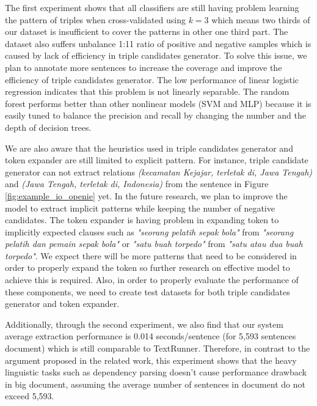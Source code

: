 The first experiment shows that all classifiers are still having problem learning the pattern of triples when cross-validated using $k=3$ which means two thirds of our dataset is insufficient to cover the patterns in other one third part. The dataset also suffers unbalance 1:11 ratio of positive and negative samples which is caused by lack of efficiency in triple candidates generator. To solve this issue, we plan to annotate more sentences to increase the coverage and improve the efficiency of triple candidates generator. The low performance of linear logistic regression indicates that this problem is not linearly separable. The random forest performs better than other nonlinear models (SVM and MLP) because it is easily tuned to balance the precision and recall by changing the number and the depth of decision trees.

We are also aware that the heuristics used in triple candidates generator and token expander are still limited to explicit pattern. For instance, triple candidate generator can not extract relations \textit{(kecamatan Kejajar, terletak di, Jawa Tengah)} and \textit{(Jawa Tengah, terletak di, Indonesia)} from the sentence in Figure \ref{fig:example_io_openie} yet. In the future research, we plan to improve the model to extract implicit patterns while keeping the number of negative candidates. The token expander is having problem in expanding token to implicitly expected clauses such as \textit{"seorang pelatih sepak bola"} from \textit{"seorang pelatih dan pemain sepak bola"} or \textit{"satu buah torpedo"} from \textit{"satu atau dua buah torpedo"}. We expect there will be more patterns that need to be considered in order to properly expand the token so further research on effective model to achieve this is required. Also, in order to properly evaluate the performance of these components, we need to create test datasets for both triple candidates generator and token expander.

Additionally, through the second experiment, we also find that our system average extraction performance is 0.014 seconds/sentence (for 5,593 sentences document) which is still comparable to TextRunner\citep{banko2007open}. Therefore, in contrast to the argument proposed in the related work\citep{banko2007open}\citep{etzioni2011open}, this experiment shows that the heavy linguistic tasks such as dependency parsing doesn't cause performance drawback in big document, assuming the average number of sentences in document do not exceed 5,593.

